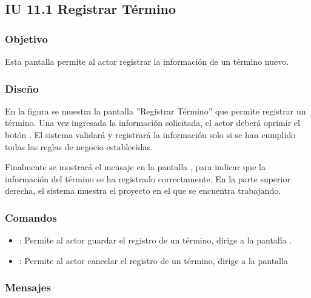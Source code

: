 \subsection{IU 11.1 Registrar Término}

\subsubsection{Objetivo}
	Esta pantalla permite al actor registrar la información de un término nuevo.
\subsubsection{Diseño}
	En la figura  se muestra la pantalla ''Registrar Término'' que permite registrar un término.
	Una vez ingresada la información solicitada, el actor deberá oprimir el botón  . El sistema validará y registrará la información solo si se han cumplido todas las reglas de negocio establecidas.
	
	Finalmente se mostrará el mensaje  en la pantalla , para indicar que la información del término se ha registrado correctamente.
	En la parte superior derecha, el sistema muestra el proyecto en el que se encuentra trabajando.

\subsubsection{Comandos}
\begin{itemize}
	\item {}: Permite al actor guardar el registro de un término, dirige a la pantalla .
	\item {}: Permite al actor cancelar el registro de un término, dirige a la pantalla 
\end{itemize}

\subsubsection{Mensajes}

